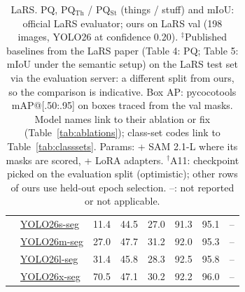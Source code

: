 \begin{table}[t]
{\begin{tabular}{l|lrccccc}
 & \hyperlink{abl:A11}{YOLO26s-seg} & 11.4 & 44.5 & 27.0 & 91.3 & 95.1 & -- \\
 & \hyperlink{abl:A11}{YOLO26m-seg} & 27.0 & 47.7 & 31.2 & 92.0 & 95.3 & -- \\
 & \hyperlink{abl:A11}{YOLO26l-seg} & 31.4 & 45.8 & 28.3 & 92.5 & 95.8 & -- \\
 & \hyperlink{abl:A11}{YOLO26x-seg} & 70.5 & 47.1 & 30.2 & 92.2 & 96.0 & -- \\
\bottomrule
\end{tabular}}
\caption{LaRS. PQ, PQ$_\mathrm{Th}$ / PQ$_\mathrm{St}$ (things / stuff) and mIoU: official LaRS evaluator; ours on LaRS val (198 images, YOLO26 at confidence 0.20). $^\ddagger$Published baselines from the LaRS paper (Table 4: PQ; Table 5: mIoU under the semantic setup) on the LaRS test set via the evaluation server: a different split from ours, so the comparison is indicative. Box AP: pycocotools mAP@[.50:.95] on boxes traced from the val masks. Model names link to their ablation or fix (Table~\ref{tab:ablations}); class-set codes link to Table~\ref{tab:classsets}. Params: + SAM 2.1-L where its masks are scored, + LoRA adapters. $^\dagger$A11: checkpoint picked on the evaluation split (optimistic); other rows of ours use held-out epoch selection. --: not reported or not applicable.}
\label{tab:results_lars}
\end{table}

